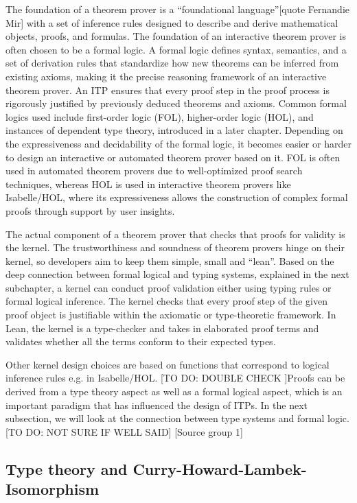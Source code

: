 The foundation of a theorem prover is a “foundational language”[quote Fernandie Mir] with a set of inference rules designed to describe and derive mathematical objects, proofs, and formulas. The foundation of an interactive theorem prover is often chosen to be a formal logic. A formal logic defines syntax, semantics, and a set of derivation rules that standardize how new theorems can be inferred from existing axioms, making it the precise reasoning framework of an interactive theorem prover. An ITP ensures that every proof step in the proof process is rigorously justified by previously deduced theorems and axioms. Common formal logics used include first-order logic (FOL), higher-order logic (HOL), and instances of dependent type theory, introduced in a later chapter. Depending on the expressiveness and decidability of the formal logic, it becomes easier or harder to design an interactive or automated theorem prover based on it. FOL is often used in automated theorem provers due to well-optimized proof search techniques, whereas HOL is used in interactive theorem provers like Isabelle/HOL, where its expressiveness allows the construction of complex formal proofs through support by user insights.

The actual component of a theorem prover that checks that proofs for validity is the kernel. The trustworthiness and soundness of theorem provers hinge on their kernel,  so developers aim to keep them simple, small and “lean”. 
Based on the deep connection between formal logical and typing systems, explained in the next subchapter, a kernel can conduct proof validation either using typing rules or formal logical inference. The kernel checks that every proof step of the given proof object is justifiable within the axiomatic or type-theoretic framework. In Lean, the kernel is a type-checker and takes in elaborated proof terms and validates whether all the terms conform to their expected types. 

Other kernel design choices are based on functions that correspond to logical inference rules e.g. in Isabelle/HOL. [TO DO: DOUBLE CHECK ]Proofs can be derived from a type theory aspect as well as a formal logical aspect, which is an important paradigm that has influenced the design of ITPs. In the next subsection, we will look at the connection between type systems and formal logic. [TO DO: NOT SURE IF WELL SAID]  [Source group 1]

\subsection{Type theory and Curry-Howard-Lambek-Isomorphism}

